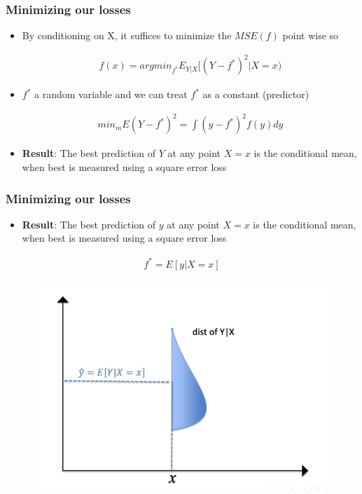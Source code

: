 \documentclass[
  shownotes,
  xcolor={svgnames},
  hyperref={colorlinks,citecolor=DarkBlue,linkcolor=andesred,urlcolor=DarkBlue}
  , aspectratio=169]{beamer}
\begin{document}
\begin{frame}
\frametitle{Minimizing our losses}
\begin{itemize}

  
  \item By conditioning on X, it suffices to minimize  the $MSE(f)$ point wise so
  \medskip


\begin{align}
  f(x)= argmin_{f^*} E_{Y|X} [(Y-f^*)^2|X=x)
\end{align}



\item $f^*$ a random variable and we can treat $f^*$ as a constant (predictor)


\begin{align}
min_m E(Y-f^*)^2= \int (y-f^*)^2  f(y)dy
\end{align}

\item {\bf Result}: The best prediction of $Y$ at any point $X = x$ is the conditional mean, when best is measured using a square error loss
\end{itemize}

\end{frame}
\begin{frame}
\frametitle{Minimizing our losses}
\begin{itemize}
\item {\bf Result}: The best prediction of $y$ at any point $X = x$ is the conditional mean, when best is measured using a square error loss
\end{itemize}
\begin{align}
f^* = E[y|X=x]
\end{align}

  \begin{figure}[H] \centering
            \captionsetup{justification=centering}  
            \includegraphics[scale=0.6]{figures/cond_distrib2.png}
            
    \end{figure}

\end{frame}
\end{document}
